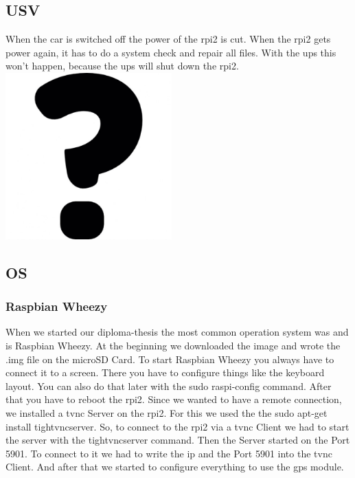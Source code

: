 \subsection{USV}
When the car is switched off the power of the \gls{rpi2} is cut. When the \gls{rpi2} gets power again, it has to do a system check and repair all files. With the \gls{ups} this won’t happen, because the \gls{ups} will shut down the \gls{rpi2}.\newline
\includegraphics[width=0.48\textwidth]{bilder/USV}
\newpage
\subsection{OS}
\subsubsection{Raspbian Wheezy}
When we started our diploma-thesis the most common operation system was and is Raspbian Wheezy. At the beginning we downloaded the image and wrote the .img file on the microSD Card. To start Raspbian Wheezy you always have to connect it to a screen. There you have to configure things like the keyboard layout. You can also do that later with the sudo raspi-config command. After that you have to reboot the \gls{rpi2}.
Since we wanted to have a remote connection, we installed a \gls{tvnc} Server on the \gls{rpi2}. For this we used the the sudo apt-get install tightvncserver. So, to connect to the \gls{rpi2} via a \gls{tvnc} Client we had to start the server with the tightvncserver command. Then the Server started on the Port 5901. To connect to it we had to write the \gls{ip} and the Port 5901 into the \gls{tvnc} Client. And after that we started to configure everything to use the \gls{gps} module.
